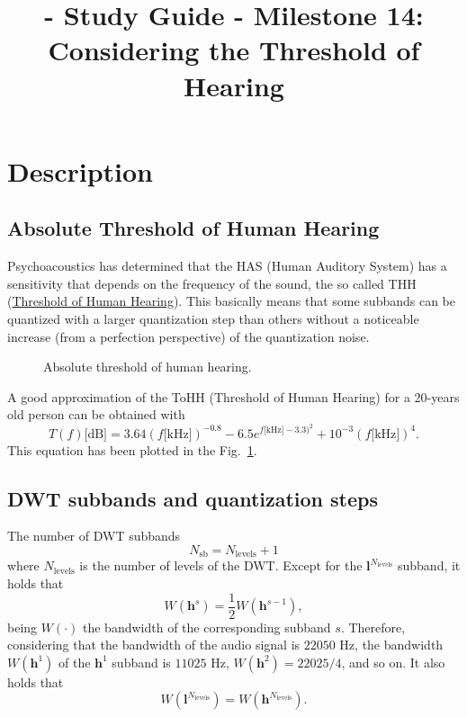 
\title{\TM{} - Study Guide - Milestone 14: Considering the Threshold of Hearing}

\maketitle

\section{Description}

\subsection{Absolute Threshold of Human Hearing}
Psychoacoustics has determined that the HAS (Human Auditory System)
has a sensitivity that depends on the frequency of the sound, the so
called THH
(\href{https://en.wikipedia.org/wiki/Absolute_threshold_of_hearing}{Threshold
  of Human Hearing}). This basically means that some subbands can be
quantized with a larger quantization step than others without a
noticeable increase (from a perfection perspective) of the
quantization noise.

\begin{figure}
  \centering
  \caption{Absolute threshold of human hearing.}
  \label{fig:ToHH}
\end{figure}

A good approximation of the ToHH (Threshold of Human Hearing) for a 20-years old person can be
obtained with~\cite{bosi2003intro}
\begin{equation}
  T(f)\text{[dB]} = 3.64(f\text{[kHz]})^{-0.8} - 6.5e^{f\text{[kHz]}-3.3)^2} + 10^{-3}(f\text{[kHz]})^4.
  \label{eq:ToHH}
\end{equation}
This equation has been plotted in the Fig.~\ref{fig:ToHH}.

\subsection{DWT subbands and quantization steps}
The number of DWT subbands
\begin{equation}
  N_{\text{sb}} = N_{\text{levels}} + 1
\end{equation}
where $N_{\text{levels}}$ is the number of levels of the DWT. Except for
the ${\mathbf l}^{N_{\text{levels}}}$ subband, it holds that
\begin{equation}
  W({\mathbf h}^s) = \frac{1}{2}W({\mathbf h}^{s-1}),
\end{equation}
being $W(\cdot)$ the bandwidth of the corresponding
subband $s$. Therefore, considering that the bandwidth of the audio signal
is $22050$ Hz, the bandwidth $W({\mathbf h}^1)$ of the ${\mathbf h}^1$ subband is $11025$ Hz,
$W({\mathbf h} ^2)=22025/4$, and so on. It also holds that
\begin{equation}
  W({\mathbf l}^{N_{\text{levels}}}) = W({\mathbf h}^{N_{\text{levels}}}).
\end{equation}

